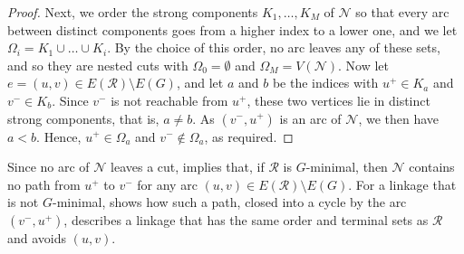 \documentclass[fontsize=12pt,leading=14pt]{fullpaper}
\newcommand{\Ncal}{\mathcal{N}}
\newcommand{\Rcal}{\mathcal{R}}
\begin{document}
\begin{proof}
  Next, we order the strong components $K_1,\dots,K_M$ of $\Ncal$ so that every arc between distinct components goes from a higher index to a lower one, and we let $\Omega_i=K_1\cup\dots\cup K_i$.
  By the choice of this order, no arc leaves any of these sets, and so they are nested cuts with $\Omega_0=\emptyset$ and $\Omega_M=V(\Ncal)$.
  Now let $e=(u,v)\in E(\Rcal)\setminus E(G)$, and let $a$ and $b$ be the indices with $u^+\in K_a$ and $v^-\in K_b$.
  Since $v^-$ is not reachable from $u^+$, these two vertices lie in distinct strong components, that is, $a\ne b$.
  As $(v^-,u^+)$ is an arc of $\Ncal$, we then have $a<b$.
  Hence, $u^+\in\Omega_a$ and $v^-\notin\Omega_a$, as required.
\end{proof}

Since no arc of $\Ncal$ leaves a cut,  implies that, if $\Rcal$ is $G$-minimal, then $\Ncal$ contains no path from $u^+$ to $v^-$ for any arc $(u,v)\in E(\Rcal)\setminus E(G)$.
For a linkage that is not $G$-minimal,  shows how such a path, closed into a cycle by the arc $(v^-,u^+)$, describes a linkage that has the same order and terminal sets as $\Rcal$ and avoids $(u,v)$.
\end{document}
